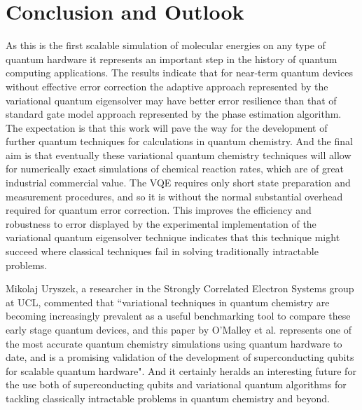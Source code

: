\documentclass[12pt]{article}
\begin{document}
\section{Conclusion and Outlook}

As this is the first scalable simulation of molecular energies on any type of quantum hardware it represents an important step in the history of
quantum computing applications. The results indicate that for near-term quantum devices without effective error correction the adaptive approach
represented by the variational quantum eigensolver may have better error resilience than that of standard gate model approach represented by the
phase estimation algorithm. The expectation is that this work will pave the way for the development of further quantum techniques for calculations
 in quantum chemistry. And the final aim is that eventually these variational quantum chemistry techniques will allow for numerically exact simulations
  of chemical reaction rates, which are of great industrial commercial value. The VQE requires only short state preparation
 and measurement procedures, and so it is without the normal substantial overhead required for quantum error correction. This improves the efficiency
 and robustness to error displayed by the experimental implementation of the variational quantum eigensolver technique indicates that this technique
  might succeed where classical techniques fail in solving traditionally intractable problems.

 Mikolaj Uryszek, a researcher in the Strongly Correlated Electron Systems group at UCL, commented that ``variational techniques in quantum chemistry
 are becoming increasingly prevalent as a useful benchmarking tool to compare these early stage quantum devices, and this paper by O’Malley et al.
 represents one of the most accurate quantum chemistry simulations using quantum hardware to date, and is a promising validation of the
  development of superconducting qubits for scalable quantum hardware". And it certainly heralds an interesting future for the use both of
  superconducting qubits and variational quantum algorithms for tackling classically intractable problems in quantum chemistry and beyond.
\end{document}
